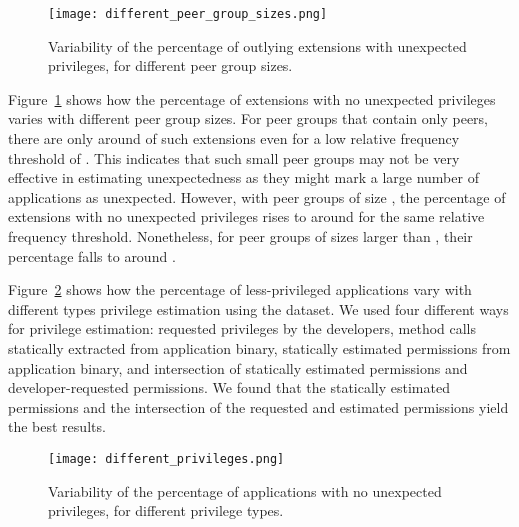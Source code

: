 \begin{figure}[!htbp]
\centering
\texttt{[image: different\_peer\_group\_sizes.png]}
\caption{Variability of the percentage of outlying extensions with unexpected privileges, for different peer group sizes.}
\label{fig:percentage_unexpected_peer_group_size}
\end{figure}

 Figure~\ref{fig:percentage_unexpected_peer_group_size} 
shows how the percentage of  \Chrome{} extensions with no unexpected privileges varies 
with different peer group sizes. For peer groups that contain only  peers, there are only 
around  of such extensions even for a low relative frequency threshold of .  
This indicates that such small peer groups may not be very effective in estimating unexpectedness 
as they might mark a large number of applications as unexpected. However, with peer groups of 
size , the percentage of extensions with no unexpected privileges rises to around  
for the same relative frequency threshold. Nonetheless, for peer groups of sizes larger than 
, their percentage falls to around .

 Figure~\ref{fig:percentage_unexpected_different_privileges} 
shows how the percentage of less-privileged applications vary with different types privilege estimation using the 
\Android{} dataset. We used four different ways for privilege estimation: requested privileges by the 
developers, method calls statically extracted from application binary,  statically estimated permissions from 
application binary, and intersection of statically estimated permissions and developer-requested permissions. 
We found that the statically estimated permissions and the intersection of the requested and estimated permissions 
yield the best results. 



\begin{figure}[!t]
\centering
\texttt{[image: different\_privileges.png]}
\caption{Variability of the percentage of applications with no unexpected privileges, for different privilege types.}
\label{fig:percentage_unexpected_different_privileges}
\end{figure}





